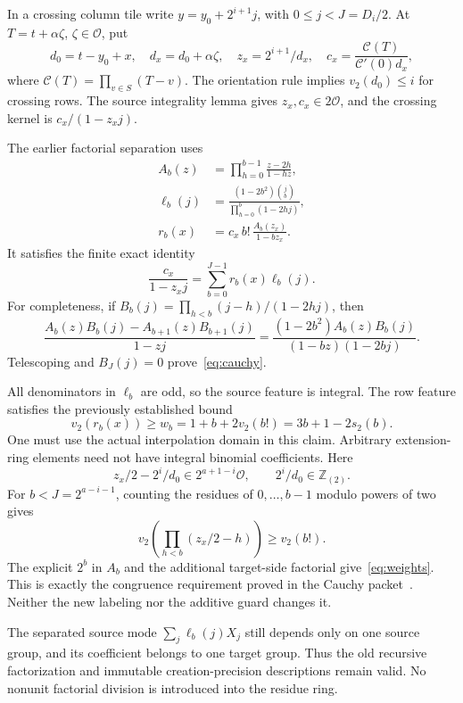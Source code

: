 \documentclass[11pt,letterpaper]{article}
\numberwithin{equation}{section}
\theoremstyle{definition}\newtheorem{definition}[theorem]{Definition}
\theoremstyle{remark}\newtheorem{remark}[theorem]{Remark}
\newcommand{\vTwo}{v_2}
\newcommand{\OO}{\mathcal O}
\newcommand{\CC}{\mathcal C}
\begin{document}
In a crossing column tile write $y=y_0+2^{i+1}j$, with $0\le j<J=D_i/2$. At $T=t+\alpha\zeta$, $\zeta\in\OO$, put
\[
 d_0=t-y_0+x,\quad d_x=d_0+\alpha\zeta,\quad
 z_x=2^{i+1}/d_x,\quad
 c_x=\frac{\CC(T)}{\CC'(0)d_x},
\]
where $\CC(T)=\prod_{v\in S}(T-v)$. The orientation rule implies $\vTwo(d_0)\le i$ for crossing rows. The source integrality lemma gives $z_x,c_x\in2\OO$, and the crossing kernel is $c_x/(1-z_xj)$.

The earlier factorial separation uses
\begin{align}
 A_b(z)&=\prod_{h=0}^{b-1}\frac{z-2h}{1-hz},\\
 \ell_b(j)&=\frac{(1-2b^2)\binom jb}{\prod_{h=0}^b(1-2hj)},\\
 r_b(x)&=c_x\,b!\,\frac{A_b(z_x)}{1-bz_x}.
\end{align}
It satisfies the finite exact identity
\begin{equation}\label{eq:cauchy}
 \frac{c_x}{1-z_xj}=\sum_{b=0}^{J-1}r_b(x)\ell_b(j).
\end{equation}
For completeness, if $B_b(j)=\prod_{h<b}(j-h)/(1-2hj)$, then
\[
 \frac{A_b(z)B_b(j)-A_{b+1}(z)B_{b+1}(j)}{1-zj}
 =\frac{(1-2b^2)A_b(z)B_b(j)}{(1-bz)(1-2bj)}.
\]
Telescoping and $B_J(j)=0$ prove~\eqref{eq:cauchy}.

All denominators in $\ell_b$ are odd, so the source feature is integral. The row feature satisfies the previously established bound
\begin{equation}\label{eq:weights}
 \vTwo(r_b(x))\ge w_b=1+b+2\vTwo(b!)=3b+1-2s_2(b).
\end{equation}
One must use the actual interpolation domain in this claim. Arbitrary extension-ring elements need not have integral binomial coefficients. Here
\[
 z_x/2-2^i/d_0\in2^{a+1-i}\OO,\qquad 2^i/d_0\in\mathbb Z_{(2)}.
\]
For $b<J=2^{a-i-1}$, counting the residues of $0,\ldots,b-1$ modulo powers of two gives
\[
 \vTwo\!\left(\prod_{h<b}(z_x/2-h)\right)\ge\vTwo(b!).
\]
The explicit $2^b$ in $A_b$ and the additional target-side factorial give~\eqref{eq:weights}. This is exactly the congruence requirement proved in the Cauchy packet~\cite{cauchypacket}. Neither the new labeling nor the additive guard changes it.

The separated source mode $\sum_j\ell_b(j)X_j$ still depends only on one source group, and its coefficient belongs to one target group. Thus the old recursive factorization and immutable creation-precision descriptions remain valid. No nonunit factorial division is introduced into the residue ring.
\end{document}
